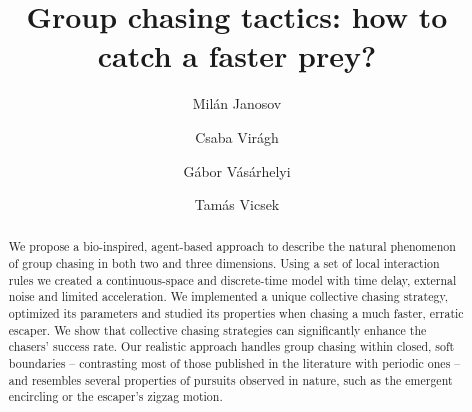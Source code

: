 \documentclass[12pt,a4paper,final]{iopart}
\begin{document}
\title{Group chasing tactics: how to catch a faster prey?}

\author[cor1]{Mil\'an Janosov}
\address{E\"{o}tv\"{o}s Lor\'and University}

\author{Csaba Vir\'agh}
\address{E\"{o}tv\"{o}s Lor\'and University}

\author{G\'abor V\'as\'arhelyi}
\address{MTA-ELTE Statistical and Biological Physics Research Group}

\author{Tam\'as Vicsek}
\address{Department of Biological Physics, Eötvös Loránd University \\ MTA-ELTE Statistical and Biological Physics Research Group}













\begin{abstract}
We propose a bio-inspired, agent-based approach to describe the natural phenomenon of group chasing in both two and three dimensions. Using a set of local interaction rules we created a continuous-space and discrete-time model with time delay, external noise and limited acceleration. We implemented a unique collective chasing strategy, optimized its parameters and studied its properties when chasing a much faster, erratic escaper. We show that collective chasing strategies can significantly enhance the chasers' success rate. Our realistic approach handles group chasing within closed, soft boundaries -- contrasting most of those published in the literature with periodic ones -- and resembles several properties of pursuits observed in nature, such as the emergent encircling or the escaper's zigzag motion. 
\end{abstract}

\end{document}
